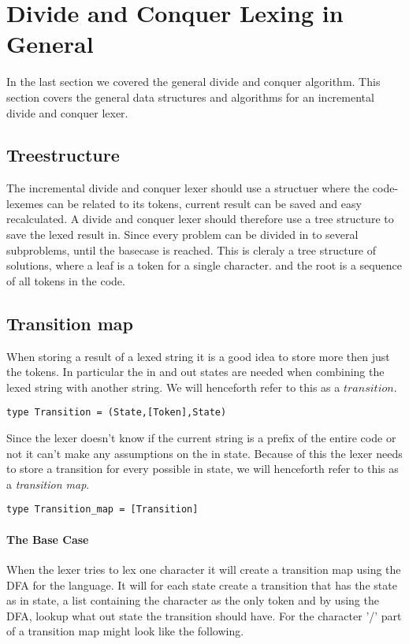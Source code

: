 \section{Divide and Conquer Lexing in General}
In the last section we covered the general divide and conquer algorithm. This
section covers the general data structures and algorithms for an incremental
divide and conquer lexer.

\subsection{Treestructure} %
The incremental divide and conquer lexer should use a structuer where the
code-lexemes can be related to its tokens, current result can be saved and easy
recalculated. A divide and conquer lexer should therefore use a tree structure
to save the lexed result in. Since every problem can be divided in to several
subproblems, until the basecase is reached. This is cleraly a tree structure of
solutions, where a leaf is a token for a single character. and the root
is a sequence of all tokens in the code.  



\subsection{Transition map} %
When storing a result of a lexed string it is a good idea to store more then
just the tokens. In particular the in and out states are needed when combining
the lexed string with another string. We will henceforth refer to this as a
$transition$.
\begin{verbatim}
type Transition = (State,[Token],State)
\end{verbatim}
Since the lexer doesn't know if the current string is a prefix of the entire
code or not it can't make any assumptions on the in state. Because of this the
lexer needs to store a transition for every possible in state, we will henceforth
refer to this as a \emph{transition map}.
\begin{verbatim}
type Transition_map = [Transition]
\end{verbatim}
\paragraph{The Base Case}
When the lexer tries to lex one character it will create a transition
map using the DFA for the language. It will for each state create a transition
that has the state as in state, a list containing the character as the only
token and by using the DFA, lookup what out state the transition should have.
For the character '/' part of a transition map might look like the following.


